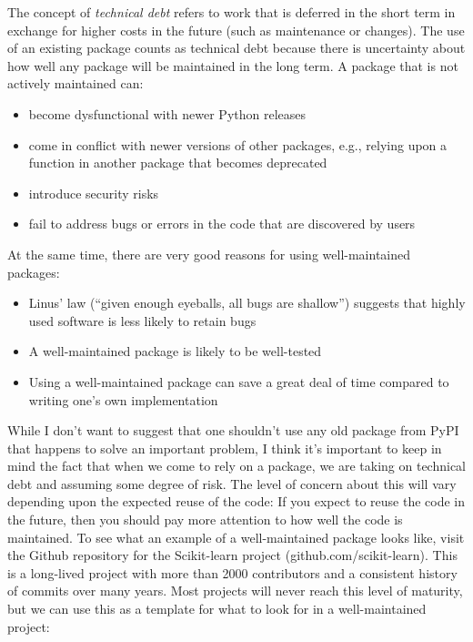 The concept of \textit{technical debt} refers to work that is deferred in the short term in exchange for higher costs in the future (such as maintenance or changes).
The use of an existing package counts as technical debt because there is uncertainty about how well any package will be maintained in the long term.
A package that is not actively maintained can:

\begin{itemize}
\item become dysfunctional with newer Python releases
\item come in conflict with newer versions of other packages, e.g., relying upon a function in another package that becomes deprecated
\item introduce security risks
\item fail to address bugs or errors in the code that are discovered by users
\end{itemize}

At the same time, there are very good reasons for using well-maintained packages:

\begin{itemize}
\item Linus' law (``given enough eyeballs, all bugs are shallow'') \citep{Raymond:1999aa} suggests that highly used software is less likely to retain bugs
\item A well-maintained package is likely to be well-tested
\item Using a well-maintained package can save a great deal of time compared to writing one's own implementation
\end{itemize}

While I don't want to suggest that one shouldn't use any old package from PyPI that happens to solve an important problem, I think it's important to keep in mind the fact that when we come to rely on a package, we are taking on technical debt and assuming some degree of risk.
The level of concern about this will vary depending upon the expected reuse of the code: If you expect to reuse the code in the future, then you should pay more attention to how well the code is maintained.
To see what an example of a well-maintained package looks like, visit the Github repository for the Scikit-learn project (github.com/scikit-learn).
This is a long-lived project with more than 2000 contributors and a consistent history of commits over many years.
Most projects will never reach this level of maturity, but we can use this as a template for what to look for in a well-maintained project:

